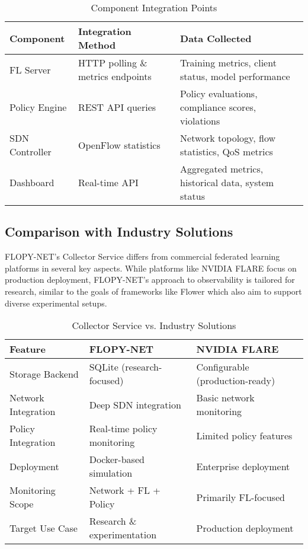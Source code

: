 \begin{table}[H]
\centering
\caption{Component Integration Points}
\label{tab:collector-integration}
\begin{tabular}{@{}llp{5cm}@{}}
\toprule
\textbf{Component} & \textbf{Integration Method} & \textbf{Data Collected} \\
\midrule
FL Server & HTTP polling \& metrics endpoints & Training metrics, client status, model performance \\
Policy Engine & REST API queries & Policy evaluations, compliance scores, violations \\
SDN Controller & OpenFlow statistics & Network topology, flow statistics, QoS metrics \\
Dashboard & Real-time API & Aggregated metrics, historical data, system status \\
\bottomrule
\end{tabular}
\end{table}

\subsection{Comparison with Industry Solutions}

FLOPY-NET's Collector Service differs from commercial federated learning platforms in several key aspects. While platforms like NVIDIA FLARE \cite{nvidia2023flare} focus on production deployment, FLOPY-NET's approach to observability is tailored for research, similar to the goals of frameworks like Flower \cite{beutel2020flower} which also aim to support diverse experimental setups.

\begin{table}[H]
\centering
\caption{Collector Service vs. Industry Solutions}
\label{tab:collector-comparison}
\begin{tabular}{@{}lll@{}}
\toprule
\textbf{Feature} & \textbf{FLOPY-NET} & \textbf{NVIDIA FLARE} \\
\midrule
Storage Backend & SQLite (research-focused) & Configurable (production-ready) \\
Network Integration & Deep SDN integration & Basic network monitoring \\
Policy Integration & Real-time policy monitoring & Limited policy features \\
Deployment & Docker-based simulation & Enterprise deployment \\
Monitoring Scope & Network + FL + Policy & Primarily FL-focused \\
Target Use Case & Research \& experimentation & Production deployment \\
\bottomrule
\end{tabular}
\end{table}

